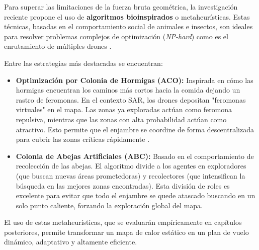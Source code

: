 Para superar las limitaciones de la fuerza bruta geométrica, la investigación reciente propone el uso de \textbf{algoritmos bioinspirados} o metaheurísticas. Estas técnicas, basadas en el comportamiento social de animales e insectos, son ideales para resolver problemas complejos de optimización (\textit{NP-hard}) como es el enrutamiento de múltiples drones \cite{Multiple_Fixed-Wing_Unmanned_Aerial_Vehicles}.

Entre las estrategias más destacadas se encuentran:
\begin{itemize}
    \item \textbf{Optimización por Colonia de Hormigas (ACO):} Inspirada en cómo las hormigas encuentran los caminos más cortos hacia la comida dejando un rastro de feromonas. En el contexto SAR, los drones depositan "feromonas virtuales" en el mapa. Las zonas ya exploradas actúan como feromona repulsiva, mientras que las zonas con alta probabilidad actúan como atractivo. Esto permite que el enjambre se coordine de forma descentralizada para cubrir las zonas críticas rápidamente \cite{carabaza-ACOr}.
    \item \textbf{Colonia de Abejas Artificiales (ABC):} Basado en el comportamiento de recolección de las abejas. El algoritmo divide a los agentes en exploradores (que buscan nuevas áreas prometedoras) y recolectores (que intensifican la búsqueda en las mejores zonas encontradas). Esta división de roles es excelente para evitar que todo el enjambre se quede atascado buscando en un solo punto caliente, forzando la exploración global del mapa.
\end{itemize}

El uso de estas metaheurísticas, que se evaluarán empíricamente en capítulos posteriores, permite transformar un mapa de calor estático en un plan de vuelo dinámico, adaptativo y altamente eficiente.
